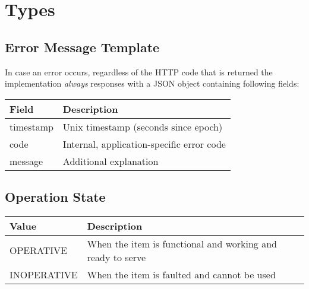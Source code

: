 \section{Types}

%

\subsection{Error Message Template}
\label{types:error-msg-template}

In case an error occurs, regardless of the HTTP code that is returned the implementation \textit{always} responses with a JSON object containing following fields: 

\begin{tabularx}{\linewidth}{ | l | X | }
  \hline
  \rowcolor{table-head}
  Field & Description \\
  \hline
  timestamp & Unix timestamp (seconds since epoch)  \\
  code 		& Internal, application-specific error code \\
  message 	& Additional explanation \\
  \hline
\end{tabularx}


\subsection{Operation State}
\label{types:OperationState}

\begin{tabularx}{\linewidth}{ | l | X | }
  \hline
  \rowcolor{table-head}
  Value & Description \\
  \hline
  OPERATIVE 		& When the item is functional and working and ready to serve \\
  INOPERATIVE 	& When the item is faulted and cannot be used \\
  \hline
\end{tabularx}

